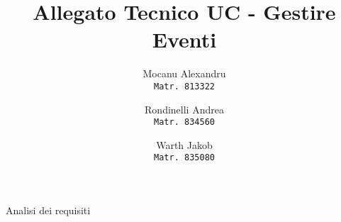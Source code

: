 \documentclass[14pt]{extarticle}
\title{Allegato Tecnico UC - Gestire Eventi}
\author{
  Mocanu Alexandru\\
  \texttt{Matr. 813322}
  \and
  Rondinelli Andrea\\
  \texttt{Matr. 834560}
  \and
  Warth Jakob\\
  \texttt{Matr. 835080}
}
\date{}
\begin{document}
\maketitle
\centering
\vspace{\fill}
\Huge{Analisi dei requisiti}
\end{document}
